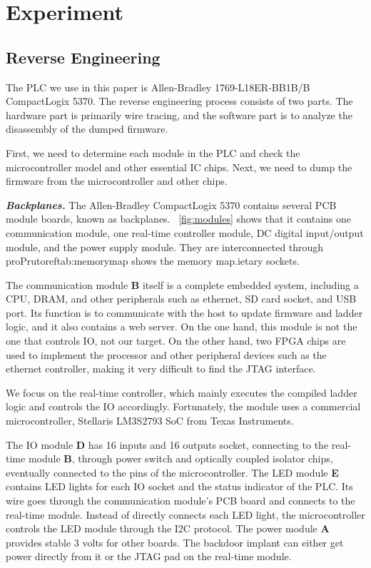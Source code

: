 \section{Experiment}
\label{sec:implant-experiment}

\subsection{Reverse Engineering}
The PLC we use in this paper is Allen-Bradley 1769-L18ER-BB1B/B CompactLogix 5370. The reverse engineering process consists of two parts. The hardware part is primarily wire tracing, and the software part is to analyze the disassembly of the dumped firmware.

First, we need to determine each module in the PLC and check the microcontroller model and other essential IC chips. Next, we need to dump the firmware from the microcontroller and other chips.

\textbf{\textit{Backplanes.}} The Allen-Bradley CompactLogix 5370 contains several PCB module boards, known as backplanes. ~\autoref{fig:modules} shows that it contains one communication module, one real-time controller module, DC digital input/output module, and the power supply module. They are interconnected through proPrutoref{tab:memorymap} shows the memory map.ietary sockets.

The communication module \textbf{B} itself is a complete embedded system, including a CPU, DRAM, and other peripherals such as ethernet, SD card socket, and USB port. Its function is to communicate with the host to update firmware and ladder logic, and it also contains a web server. On the one hand, this module is not the one that controls IO, not our target. On the other hand, two FPGA chips are used to implement the processor and other peripheral devices such as the ethernet controller, making it very difficult to find the JTAG interface.

We focus on the real-time controller, which mainly executes the compiled ladder logic and controls the IO accordingly. Fortunately, the module uses a commercial microcontroller, Stellaris LM3S2793 SoC from Texas Instruments.

The IO module \textbf{D} has 16 inputs and 16 outputs socket, connecting to the real-time module \textbf{B}, through power switch and optically coupled isolator chips, eventually connected to the pins of the microcontroller. The LED module \textbf{E} contains LED lights for each IO socket and the status indicator of the PLC. Its wire goes through the communication module's PCB board and connects to the real-time module. Instead of directly connects each LED light, the microcontroller controls the LED module through the I2C protocol. The power module \textbf{A} provides stable 3 volts for other boards. The backdoor implant can either get power directly from it or the JTAG pad on the real-time module.

